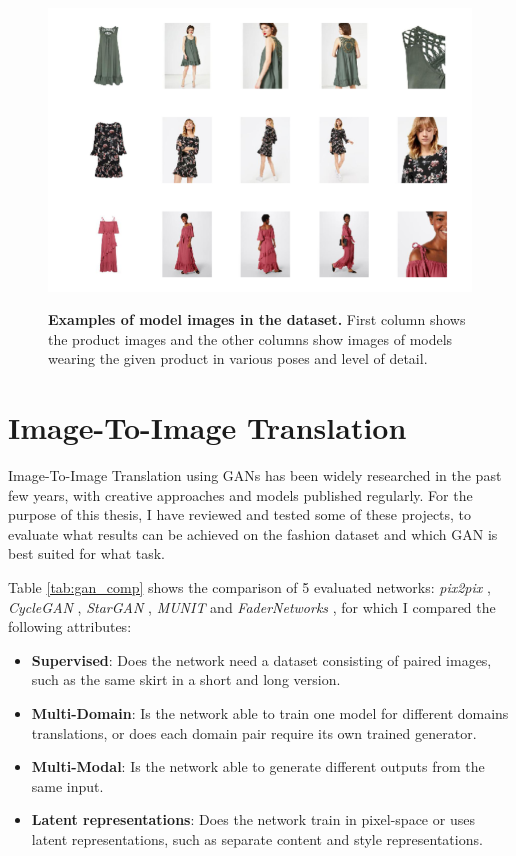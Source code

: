 \documentclass[12pt]{report}
\begin{document}
\begin{figure}[h]
\centering
{\includegraphics[width=\linewidth]{03_analysis/data/model_images}}
\caption{\label{fig:models} \textbf{Examples of model images in the dataset.} First column shows the product images and the other columns show images of models wearing the given product in various poses and level of detail.}
\end{figure}

\pagebreak
\section{Image-To-Image Translation}
Image-To-Image Translation using GANs has been widely researched in the past few years, with creative approaches and models published regularly. For the purpose of this thesis, I have reviewed and tested some of these projects, to evaluate what results can be achieved on the fashion dataset and which GAN is best suited for what task.

Table \ref{tab:gan_comp} shows the comparison of 5 evaluated networks: \textit{pix2pix} \cite{isola_image--image_2016}, \textit{CycleGAN} \cite{zhu_unpaired_2017}, \textit{StarGAN} \cite{choi_stargan_2017}, \textit{MUNIT} \cite{huang_multimodal_2018} and \textit{FaderNetworks} \cite{lample_fader_2017}, for which I compared the following attributes:
\begin{itemize}
\item \textbf{Supervised}: Does the network need a dataset consisting of paired images, such as the same skirt in a short and long version.
\item \textbf{Multi-Domain}: Is the network able to train one model for different domains translations, or does each domain pair require its own trained generator.
\item \textbf{Multi-Modal}: Is the network able to generate different outputs from the same input.
\item \textbf{Latent representations}: Does the network train in pixel-space or uses latent representations, such as separate content and style representations.
\end{itemize}
\end{document}
